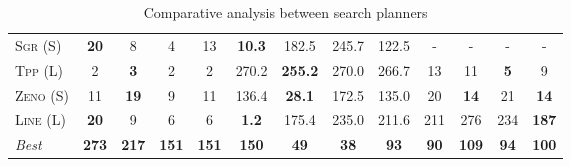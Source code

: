 \documentclass[11pt]{article}
\begin{document}
\begin{table*}[tb]
{\begin{tabular}{|l||cccc||cccc||cccc||}
\textsc{Sgr} (S)&\textbf{20}&8&4&13&\textbf{10.3}&182.5&245.7&122.5&-&-&-&-\\
\textsc{Tpp} (L)&2&\textbf{3}&2&2&270.2&\textbf{255.2}&270.0&266.7&13&11&\textbf{5}&9\\
\textsc{Zeno} (S)&11&\textbf{19}&9&11&136.4&\textbf{28.1}&172.5&135.0&20&\textbf{14}&21&\textbf{14}\\
\textsc{Line} (L)&\textbf{20}&9&6&6&\textbf{1.2}&175.4&235.0&211.6&211&276&234&\textbf{187}
\\\hline
\textit{Best}&\textbf{273}&\textbf{217}&\textbf{151}&\textbf{151}&\textbf{150}&\textbf{49}&\textbf{38}&\textbf{93}&\textbf{90}&\textbf{109}&\textbf{94}&\textbf{100}\\\hline

        \end{tabular}}
        \caption{Comparative analysis between search planners}
        \label{tab:search}
        \end{table*}
        
\end{document}
